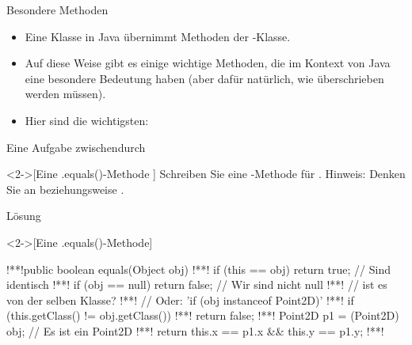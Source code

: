 \begin{frame}{Besondere Methoden}
\begin{itemize}[<+(1)->]
    \item Eine Klasse in Java übernimmt Methoden der -Klasse.
    \item Auf diese Weise gibt es einige wichtige Methoden,\pause{} die im Kontext von Java eine besondere Bedeutung haben\pause{} (aber dafür natürlich, wie  überschrieben werden müssen).
    \item Hier sind die wichtigsten: 
\end{itemize}
\end{frame}

\ifull
\begin{frame}[c]{Eine Aufgabe zwischendurch}
    \begin{exercise}<2->[Eine .equals()-Methode ]
        Schreiben Sie eine -Methode für .\pause{} Hinweis: Denken Sie an  beziehungsweise .
    \end{exercise}
\end{frame}

\begin{frame}[c,fragile]{Lösung}
    \begin{solve}<2->[Eine .equals()-Methode]
\begin{plainjava}
!**!public boolean equals(Object obj) {
!**!    if (this == obj) return true; // Sind identisch
!**!    if (obj == null) return false; // Wir sind nicht null
!**!    // ist es von der selben Klasse?
!**!    // Oder: 'if (obj instanceof Point2D)'
!**!    if (this.getClass() != obj.getClass())
!**!        return false;
!**!    Point2D p1 = (Point2D) obj; // Es ist ein Point2D
!**!    return this.x == p1.x && this.y == p1.y;
!**!}
\end{plainjava}
    \end{solve}
\end{frame}
\fi

